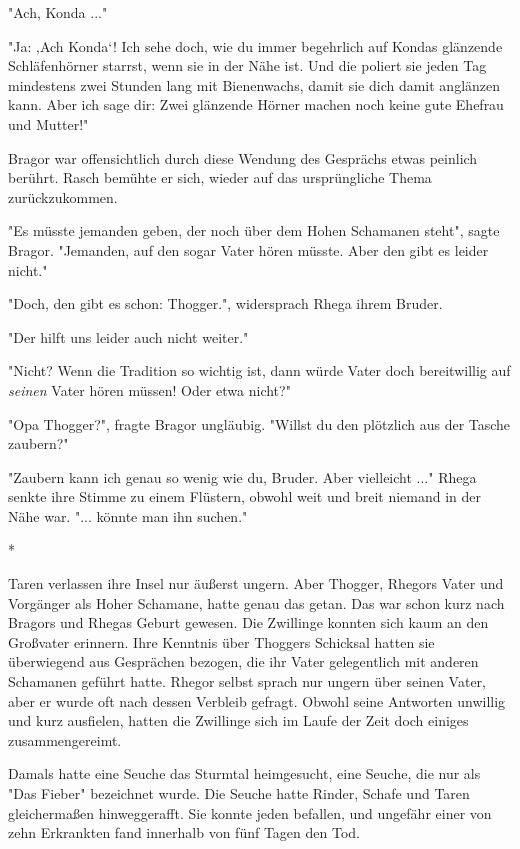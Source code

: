 \documentclass[10pt, a4paper, oneside]{book}
\begin{document}
\begin{multicols}{2}
"Ach, Konda ..." 

"Ja: ‚Ach Konda‘! Ich sehe doch, wie du immer begehrlich auf Kondas glänzende Schläfenhörner starrst, wenn sie in der Nähe ist. Und die poliert sie jeden Tag mindestens zwei Stunden lang mit Bienenwachs, damit sie dich damit anglänzen kann. Aber ich sage dir: Zwei glänzende Hörner machen noch keine gute Ehefrau und Mutter!" 

Bragor war offensichtlich durch diese Wendung des Gesprächs etwas peinlich berührt. Rasch bemühte er sich, wieder auf das ursprüngliche Thema zurückzukommen. 

"Es müsste jemanden geben, der noch über dem Hohen Schamanen steht", sagte Bragor. "Jemanden, auf den sogar Vater hören müsste. Aber den gibt es leider nicht." 

"Doch, den gibt es schon: Thogger.", widersprach Rhega ihrem Bruder.

"Der hilft uns leider auch nicht weiter."

"Nicht? Wenn die Tradition so wichtig ist, dann würde Vater doch bereitwillig auf \textit{seinen} Vater hören müssen! Oder etwa nicht?"

"Opa Thogger?", fragte Bragor ungläubig. "Willst du den plötzlich aus der Tasche zaubern?"

"Zaubern kann ich genau so wenig wie du, Bruder. Aber vielleicht ..." Rhega senkte ihre Stimme zu einem Flüstern, obwohl weit und breit niemand in der Nähe war. "... könnte man ihn suchen." 

\begin{center}
    *
\end{center}

Taren verlassen ihre Insel nur äußerst ungern. Aber Thogger, Rhegors Vater und Vorgänger als Hoher Schamane, hatte genau das getan. Das war schon kurz nach Bragors und Rhegas Geburt gewesen. Die Zwillinge konnten sich kaum an den Großvater erinnern. Ihre Kenntnis über Thoggers Schicksal hatten sie überwiegend aus Gesprächen bezogen, die ihr Vater gelegentlich mit anderen Schamanen geführt hatte. Rhegor selbst sprach nur ungern über seinen Vater, aber er wurde oft nach dessen Verbleib gefragt. Obwohl seine Antworten unwillig und kurz ausfielen, hatten die Zwillinge sich im Laufe der Zeit doch einiges zusammengereimt. 

Damals hatte eine Seuche das Sturmtal heimgesucht, eine Seuche, die nur als "Das Fieber" bezeichnet wurde. Die Seuche hatte Rinder, Schafe und Taren gleichermaßen hinweggerafft. Sie konnte jeden befallen, und ungefähr einer von zehn Erkrankten fand innerhalb von fünf Tagen den Tod. 


\end{multicols}
\end{document}
